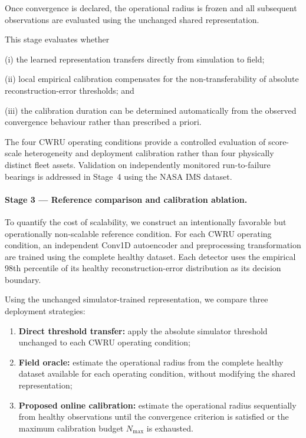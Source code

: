 \documentclass[numbered]{trbunofficial}
\begin{document}
Once convergence is declared, the operational radius is frozen and all
subsequent observations are evaluated using the unchanged shared
representation.

This stage evaluates whether

(i) the learned representation transfers directly from simulation to field;

(ii) local empirical calibration compensates for the non-transferability of
absolute reconstruction-error thresholds; and

(iii) the calibration duration can be determined automatically from the
observed convergence behaviour rather than prescribed a priori.

The four CWRU operating conditions provide a controlled evaluation of
score-scale heterogeneity and deployment calibration rather than four
physically distinct fleet assets.
Validation on independently monitored run-to-failure bearings is addressed in
Stage~4 using the NASA IMS dataset.

\paragraph{Stage 3 --- Reference comparison and calibration ablation.}

To quantify the cost of scalability, we construct an intentionally favorable
but operationally non-scalable reference condition. For each CWRU operating
condition, an independent Conv1D autoencoder and preprocessing transformation
are trained using the complete healthy dataset. Each detector uses the
empirical 98th percentile of its healthy reconstruction-error distribution
as its decision boundary.

Using the unchanged simulator-trained representation, we compare three
deployment strategies:

\begin{enumerate}[leftmargin=1.5em]

\item \textbf{Direct threshold transfer:}
apply the absolute simulator threshold unchanged to each CWRU operating
condition;

\item \textbf{Field oracle:}
estimate the operational radius from the complete healthy dataset available
for each operating condition, without modifying the shared representation;

\item \textbf{Proposed online calibration:}
estimate the operational radius sequentially from healthy observations until
the convergence criterion is satisfied or the maximum calibration budget
$N_{\max}$ is exhausted.

\end{enumerate}
\end{document}
